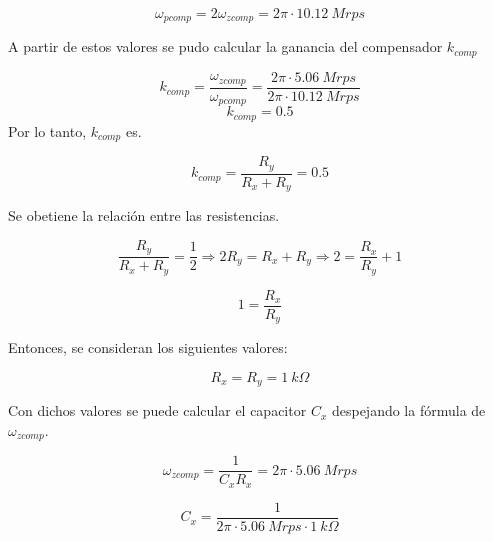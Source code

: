 \begin{equation}
    \omega _{pcomp} = 2\omega _{zcomp} = 2\pi \cdot 10.12~Mrps
\end{equation}

\hspace{1mm} A partir de estos valores se pudo calcular la ganancia del compensador \(k_{comp}\)

\begin{equation}
    k_{comp} = \frac{\omega_{zcomp}}{\omega _{pcomp}} = \frac{2\pi \cdot 5.06~Mrps}{2\pi \cdot 10.12~Mrps}
    \end{equation}
\begin{equation}
    \boxed{
    k_{comp} = 0.5
    }
\end{equation}
\hspace{1mm} Por lo tanto, \(k_{comp}\) es.

\begin{equation}
    k_{comp} = \frac{R_y}{R_x + R_y} = 0.5
\end{equation}

\hspace{1mm} Se obetiene la relación entre las resistencias.

\begin{equation}
    \frac{R_y}{R_x + R_y} = \frac{1}{2} \Longrightarrow 2R_y = R_x + R_y \Longrightarrow 2 = \frac{R_x}{R_y} + 1
\end{equation}

\begin{equation}
    \boxed{
    1 = \frac{R_x}{R_y}
    }
\end{equation}

\hspace{1mm} Entonces, se consideran los siguientes valores:

\begin{equation}
    \boxed{
    R_x = R_y = 1~k\Omega
    }
\end{equation}

\hspace{1mm} Con dichos valores se puede calcular el capacitor \(C_x\) despejando la fórmula de \(\omega_{zcomp}\).

\begin{equation}
    \omega_{zcomp} = \frac{1}{C_x R_x} = 2\pi \cdot 5.06~Mrps
\end{equation}

\begin{equation}
    C_x = \frac{1}{2\pi \cdot 5.06~Mrps \cdot 1~k\Omega}
\end{equation}

